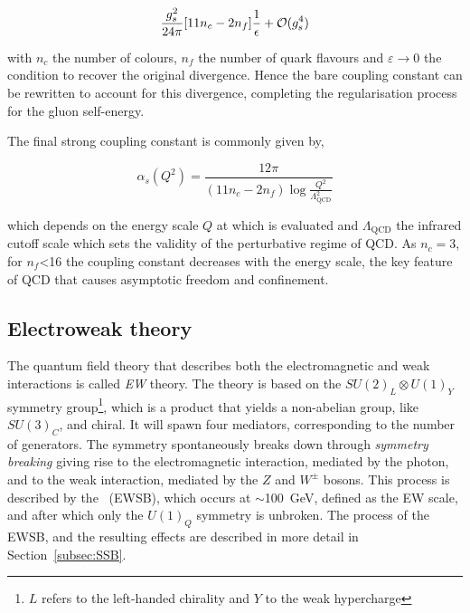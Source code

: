 \begin{equation}
    \frac{g_s^2}{24\pi}\qty[11n_c-2 n_f]\frac{1}{\epsilon}+\mathcal{O}(g_s^4)
\end{equation}

with $n_c$ the number of colours, $n_f$ the number of quark flavours and $\varepsilon\to 0$ the condition to recover the original divergence. Hence the bare coupling constant can be rewritten to account for this divergence, completing the regularisation process for the gluon self-energy.

The final strong coupling constant is commonly given by, 

\begin{equation}
    \label{Theory_eq:runningcoupling}
    \alpha_s(Q^2) = \frac{12\pi}{(11n_c - 2 n_f)\log \frac{Q^2}{\Lambda^2_\text{QCD}}}
\end{equation}

which depends on the energy scale $Q$ at which is evaluated and $\Lambda_\text{QCD}$ the infrared cutoff scale which sets the validity of the perturbative regime of \acrshort{QCD}. As $n_c=3$, for $n_f$<16 the coupling constant decreases with the energy scale, the key feature of \acrshort{QCD} that causes asymptotic freedom and confinement.

\subsection{Electroweak theory}

The quantum field theory that describes both the electromagnetic and weak interactions is called \textit{\acrlong{EW}} theory. The theory is based on the $SU(2)_L\otimes U(1)_Y$ symmetry group\footnote{$L$ refers to the left-handed chirality and $Y$ to the weak hypercharge}, which is a product that yields a non-abelian group, like $SU(3)_C$, and chiral. It will spawn four mediators, corresponding to the number of generators.
The symmetry spontaneously breaks down through \textit{symmetry breaking} giving rise to the electromagnetic interaction,
mediated by the photon, and to the weak interaction, mediated by the $Z$ and $W^\pm$ bosons.
This process is described by the \textit{}~(\acrshort{EWSB}), which occurs at $\sim$100~GeV, defined as the \acrshort{EW} scale, and after which only the $U(1)_Q$ symmetry is unbroken. The process of the \acrshort{EWSB}, and the resulting effects are described in
more detail in Section~\ref{subsec:SSB}.\\

